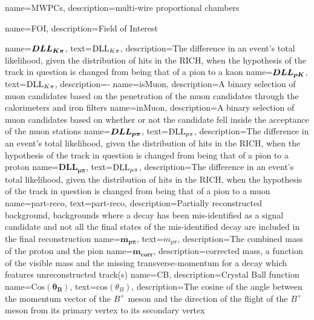 {
	name=MWPCs,
		description={multi-wire proportional chambers}
}


{
	name=FOI,
		description={Field of Interest}
}


{
	name=$\mathbold{DLL_{\kaon\pi}}$,
		text=$\mathrm{DLL}_{{K}{\pi}}$,
		description={The difference in an event’s total likelihood, given the distribution of hits in the RICH, when the hypothesis of the track in question is changed from being that of a pion to a kaon
		}}
{
	name=$\mathbold{DLL_{\proton\kaon}}$,
		text=$\mathrm{DLL}_{{K}{\pi}}$,
		description={\dllppi-\dllkpi}}
{
	name=isMuon,
		description={A binary selection of muon candidates based on the penetration of the muon candidates through the calorimeters and iron filters}
}
{
	name=inMuon,
		description={A binary selection of muon candidates based on whether or not the candidate fell inside the acceptance of the muon stations}
}                                        
{
	name=$\mathbold{DLL_{\proton\pi}}$,
		text=$\mathrm{DLL}_{{p}{\pi}}$,
		description={The difference in an event’s total likelihood, given the distribution of hits in the RICH, when the hypothesis of the track in question is changed from being that of a pion to a proton}                
}
{
	name=$\mathbold{DLL_{\mu\pi}}$,
		text=$\mathrm{DLL}_{{\mu}\pi}$,
		description={The difference in an event’s total likelihood, given the distribution of hits in the RICH, when the hypothesis of the track in question is changed from being that of a pion to a muon 
		}}
{
	name=part-reco,
		text=part-reco,
		description={Partially reconstructed background, backgrounds where a decay has been mis-identified as a signal candidate and not all the final states of the mis-identified decay are included in the final reconstruction  
		}}
{
	name=$\mathbold{m_{p\pi}}$,
		text=$m_{p\pi}$,
		description={The combined mass of the proton and the pion}
}
{
	name=$\mathbold{m_{corr}}$,
		description={corrected mass, a function of the visible mass and the missing transverse-momentum for a decay which features unreconstructed track(s)}
}                 
{
	name=CB,
		description={Crystal Ball function}
}                 
{
	        name=Cos$(\mathbold{\theta_{B}})$,
                text=cos$({\theta_{B}})$,
		description={The cosine of the angle between the momentum vector of the $B^{+}$ meson and the direction of the flight of the $B^{+}$ meson from its primary vertex to its secondary vertex }
}
